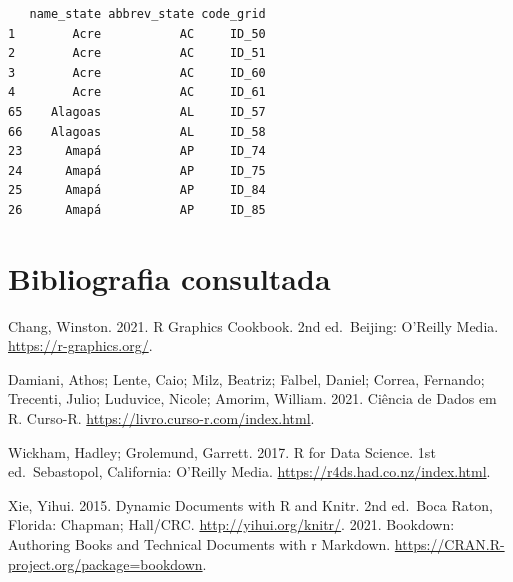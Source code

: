 \documentclass[
  brazilian,
]{book}
\begin{document}
\begin{verbatim}
   name_state abbrev_state code_grid
1        Acre           AC     ID_50
2        Acre           AC     ID_51
3        Acre           AC     ID_60
4        Acre           AC     ID_61
65    Alagoas           AL     ID_57
66    Alagoas           AL     ID_58
23      Amapá           AP     ID_74
24      Amapá           AP     ID_75
25      Amapá           AP     ID_84
26      Amapá           AP     ID_85
\end{verbatim}

\hypertarget{bibliografia-consultada}{%
\chapter*{Bibliografia consultada}\label{bibliografia-consultada}}

Chang, Winston. 2021. R Graphics Cookbook. 2nd ed.~Beijing: O'Reilly Media. \url{https://r-graphics.org/}.

Damiani, Athos; Lente, Caio; Milz, Beatriz; Falbel, Daniel; Correa, Fernando; Trecenti, Julio; Luduvice, Nicole; Amorim, William. 2021. Ciência de Dados em R. Curso-R. \url{https://livro.curso-r.com/index.html}.

Wickham, Hadley; Grolemund, Garrett. 2017. R for Data Science. 1st ed.~Sebastopol, California: O'Reilly Media. \url{https://r4ds.had.co.nz/index.html}.

Xie, Yihui. 2015. Dynamic Documents with R and Knitr. 2nd ed.~Boca Raton, Florida: Chapman; Hall/CRC. \url{http://yihui.org/knitr/}. 2021. Bookdown: Authoring Books and Technical Documents with r Markdown. \url{https://CRAN.R-project.org/package=bookdown}.

  
\end{document}
